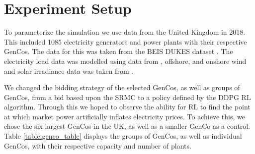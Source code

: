 \documentclass[conference]{IEEEtran}
\begin{document}






\section{Experiment Setup}
\label{sec:methodology}


To parameterize the simulation we use data from the United Kingdom in 2018. This included 1085 electricity generators and power plants with their respective GenCos. The data for this was taken from the BEIS DUKES dataset \cite{dukes_511}. The electricity load data was modelled using data from \cite{gridwatch}, offshore, and onshore wind and solar irradiance data was taken from \cite{Pfenninger2016}.

We changed the bidding strategy of the selected GenCos, as well as groups of GenCos, from a bid based upon the SRMC to a policy defined by the DDPG RL algorithm. Through this we hoped to observe the ability for RL to find the point at which market power  artificially inflates electricity prices. To achieve this, we chose the six largest GenCos in the UK, as well as a smaller GenCo as a control. Table \ref{table:genco_table} displays the groups of GenCos, as well as individual GenCos, with their respective capacity and number of plants.
\end{document}
